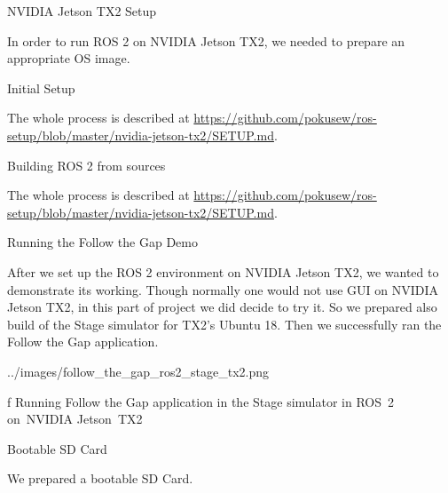 \chap[jetson] NVIDIA Jetson TX2 Setup

In order to run ROS 2 on NVIDIA Jetson TX2, we needed to prepare an appropriate OS image.


\sec Initial Setup

The whole process is described \nl at \url{https://github.com/pokusew/ros-setup/blob/master/nvidia-jetson-tx2/SETUP.md}.


\sec Building ROS 2 from sources

The whole process is described \nl at \url{https://github.com/pokusew/ros-setup/blob/master/nvidia-jetson-tx2/SETUP.md}.


\sec Running the Follow the Gap Demo

After we set up the ROS 2 environment on NVIDIA Jetson TX2, we wanted to demonstrate its working.
Though normally one would not use GUI on NVIDIA Jetson TX2, in this part of project we did decide to try it.
So we prepared also build of the Stage simulator for TX2's Ubuntu 18.
Then we successfully ran the Follow the Gap application.

\midinsert
{}
\picw=14cm \cinspic ../images/follow_the_gap_ros2_stage_tx2.png
\caption/f Running Follow the Gap application in the Stage simulator in ROS~2 on~NVIDIA Jetson~TX2
\endinsert


\sec Bootable SD Card

We prepared a bootable SD Card.

